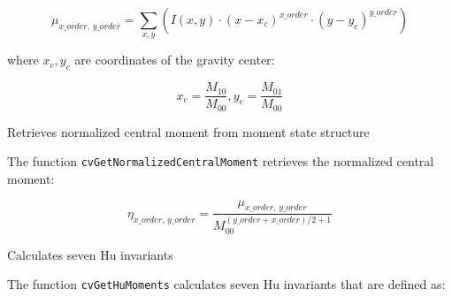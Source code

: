 \[
\mu_{x\_order, \, y\_order} = \sum_{x,y} (I(x,y) \cdot (x-x_c)^{x\_order} \cdot (y-y_c)^{y\_order})
\]

where $x_c,y_c$ are coordinates of the gravity center:

\[
x_c=\frac{M_{10}}{M_{00}}, y_c=\frac{M_{01}}{M_{00}}
\]

\label{GetNormalizedCentralMoment}

Retrieves normalized central moment from moment state structure


\begin{description}
\end{description}

The function \texttt{cvGetNormalizedCentralMoment} retrieves the normalized central moment:

\[
\eta_{x\_order, \, y\_order} = \frac{\mu_{x\_order, \, y\_order}}{M_{00}^{(y\_order+x\_order)/2+1}}
\]

\label{GetHuMoments}

Calculates seven Hu invariants


\begin{description}
\end{description}

The function \texttt{cvGetHuMoments} calculates seven Hu invariants that are defined as:

